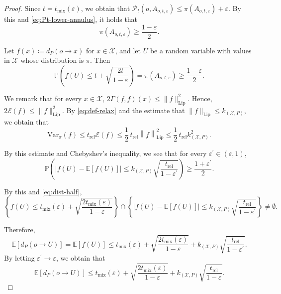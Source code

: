 \documentclass[a4paper, reqno, 11pt]{amsart}
\theoremstyle{definition}
\begin{document}
\begin{proof}
Since $t = t_{\mathrm{mix}}(\varepsilon)$, we obtain that
$\mathscr{P}_t \left(o,A_{o,t,\varepsilon}\right)\le \pi(A_{o,t,\varepsilon})+\varepsilon$. 
By this and \eqref{eq:Pt-lower-annulus}, it holds that 
\[ \pi\left(A_{o,t,\varepsilon}\right) \ge \frac{1-\varepsilon}{2}.\]

Let $f(x)\coloneqq d_P (o \to x)$ for $x \in \mathcal{X}$, and let $U$ be a random variable with values in $\mathcal{X}$ whose distribution is $\pi$.
Then
\begin{equation}\label{eq:dist-half}
\mathbb{P} \left(f(U)\le t+\sqrt{\frac{2t}{1-\varepsilon}}\right) = \pi\left(A_{o,t,\varepsilon}\right) \ge \frac{1-\varepsilon}{2}.
\end{equation}

We remark that for every $x \in \mathcal{X}$, $2\Gamma(f,f)(x) \le \|f\|_{\mathrm{Lip}}^2$.
Hence, $2\mathcal{E}(f) \le \|f\|_{\mathrm{Lip}}^2$.
By \eqref{eq:def-relax} and the estimate that $\|f\|_{\mathrm{Lip}} \le k_{(\mathcal{X}, P)}$,
we obtain that
\[ \mathrm{Var}_\pi (f)\le t_{\mathrm{rel}}\mathcal{E}(f) \le \frac{1}{2}\, t_{\mathrm{rel}} \left\|f \right\|_{\mathrm{Lip}}^2 \le \frac{1}{2}\, t_{\mathrm{rel}} k_{(\mathcal{X}, P)}^2. \]

By this estimate and Chebyshev's inequality, we see that for every $\varepsilon^{\prime} \in (\varepsilon, 1)$, 
\begin{equation*}
\mathbb{P}\left(\left|f(U)- \mathbb{E}[f(U)]\right|\le k_{(\mathcal{X}, P)}\sqrt{\frac{t_{\mathrm{rel}}}{1-\varepsilon^{\prime} }} \right)\ge \frac{1+\varepsilon^{\prime} }{2}.
\end{equation*}

By this and \eqref{eq:dist-half}, 
\[ \left\{f(U)\le t_{\mathrm{mix}}(\varepsilon) + \sqrt{\frac{2 t_{\mathrm{mix}}(\varepsilon)}{1-\varepsilon}}\right\} \cap \left\{\left|f(U)- \mathbb{E}[f(U)]\right|\le k_{(\mathcal{X}, P)}\sqrt{\frac{t_{\mathrm{rel}}}{1-\varepsilon^{\prime} }}\right\} \ne \emptyset. \]

Therefore,
\[  \mathbb{E}\left[d_P (o \to U) \right] = \mathbb{E}[f(U)] \le t_{\mathrm{mix}}(\varepsilon) + \sqrt{\frac{2t_{\mathrm{mix}}(\varepsilon)}{1-\varepsilon}} +k_{(\mathcal{X}, P)}\sqrt{\frac{t_{\mathrm{rel}}}{1-\varepsilon^{\prime} }}. \]
By letting $\varepsilon^{\prime} \to \varepsilon$,
we obtain that
\begin{equation}\label{eq:exp-dist-pi}
\mathbb{E}\left[d_P (o \to U) \right] \le t_{\mathrm{mix}}(\varepsilon) + \sqrt{\frac{2t_{\mathrm{mix}}(\varepsilon) }{1-\varepsilon}} +k_{(\mathcal{X}, P)}\sqrt{\frac{t_{\mathrm{rel}}}{1-\varepsilon}}.
\end{equation}


\end{proof}
\end{document}
